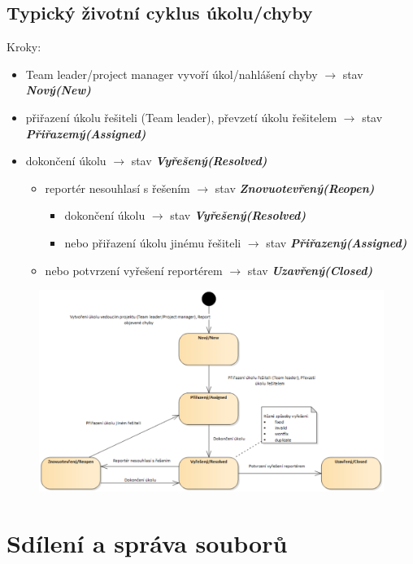 \documentclass{szzclass}
\begin{document}
\subsection{Typický životní cyklus úkolu/chyby}
Kroky:
\begin{itemize}
    \item Team leader/project manager vyvoří úkol/nahlášení chyby $\rightarrow$ stav \textit{\textbf{Nový(New)}}
    \item přiřazení úkolu řešiteli (Team leader), převzetí úkolu řešitelem $\rightarrow$ stav \textit{\textbf{Přiřazemý(Assigned)}}
    \item dokončení úkolu $\rightarrow$ stav \textit{\textbf{Vyřešený(Resolved)}}
    \begin{itemize}
        \item reportér nesouhlasí s řešením $\rightarrow$ stav \textit{\textbf{Znovuotevřený(Reopen)}}
        \begin{itemize}
            \item dokončení úkolu $\rightarrow$ stav \textit{\textbf{Vyřešený(Resolved)}}
            \item nebo přiřazení úkolu jinému řešiteli $\rightarrow$ stav \textit{\textbf{Přiřazený(Assigned)}}
        \end{itemize}
        \item nebo potvrzení vyřešení reportérem $\rightarrow$ stav \textit{\textbf{Uzavřený(Closed)}}
    \end{itemize}
\end{itemize}
\begin{figure}
    \centering
    \includegraphics[width=1\textwidth]{topics/bi-spol-30/images/cycle.png}
\end{figure}
\newpage
\section{Sdílení a správa souborů}
\end{document}
